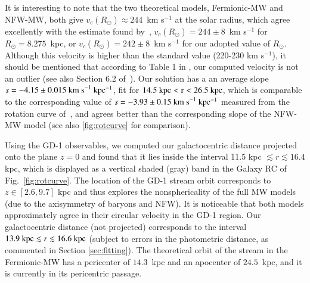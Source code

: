 \documentclass[referee]{aa} %
\begin{document}
It is interesting to note that the two theoretical models, Fermionic-MW and NFW-MW, both give $v_\mathrm{c}(R_\odot)\approx 244$~km s$^{-1}$ at the solar radius, which agree excellently with the estimate found
by~\citet{2020arXiv201202169B}, $v_c(R_\odot)=244\pm 8$~km s$^{-1}$ for $R_\odot = 8.275$~kpc, or $v_c(R_\odot)=242\pm 8$~km s$^{-1}$ for our adopted value of $R_\odot$. Although this velocity is higher than the standard value (220-230 km s$^{-1}$), it should be mentioned
that according to Table 1 in \citet{sofue_2020}, our computed velocity is not an outlier (see also Section 6.2 of~\citealt{Honma_2012}).
Our solution has a an average slope $s=-4.15\pm0.015~\rm{km~s}^{-1}~kpc^{-1}$, fit for $14.5~\rm{kpc} < r < 26.5~\rm{kpc}$, which is
comparable to the corresponding value of $s=-3.93\pm0.15~\rm{km~s}^{-1}~kpc^{-1}$ measured from the rotation curve of~\citet{Jiao2023}, and agrees better than the corresponding slope of the NFW-MW model (see also \cref{fig:rotcurve} for comparison).

Using the GD-1 observables, we computed our galactocentric distance projected onto the plane $z=0$ and found that it lies inside the interval 11.5 kpc $\lesssim r \lesssim 16.4$ kpc, which is displayed as a vertical shaded (gray) band in the Galaxy RC of Fig.~\ref{fig:rotcurve}. The location of the GD-1 stream orbit corresponds to $z\in [2.6, 9.7]$ kpc and thus explores the nonsphericality of the full MW models (due to the axisymmetry of baryons and NFW).
It is noticeable that both models approximately agree in their circular velocity in the GD-1 region.
Our galactocentric distance (not projected) corresponds to the interval $13.9~\textrm{kpc} \lesssim r \lesssim 16.6~\rm{kpc}$ (subject to errors in the photometric distance, as commented in Section \ref{sec:fitting}). The theoretical orbit of the stream in the Fermionic-MW has a pericenter of $14.3$~kpc and an apocenter of $24.5$~kpc, and it is currently in its pericentric passage.
\end{document}
